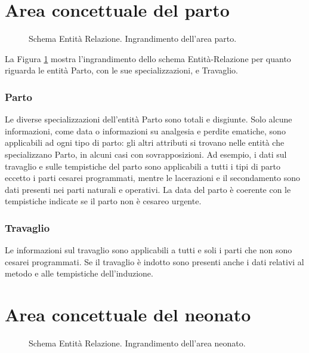 \section{Area concettuale del parto}
\label{deliveryconceptual}

\begin{figure}
    \centering
    
    \caption{Schema Entità Relazione. Ingrandimento dell'area parto.}
    \label{deliveryerdiagram}
\end{figure}

La Figura \ref{deliveryerdiagram} mostra l'ingrandimento dello schema Entità-Relazione per quanto riguarda le entità Parto, con le sue specializzazioni, e Travaglio.

\subsubsection{Parto}

Le diverse specializzazioni dell'entità Parto sono totali e disgiunte.
Solo alcune informazioni, come data o informazioni su analgesia e perdite ematiche, sono applicabili ad ogni tipo di parto: gli altri attributi si trovano nelle entità che specializzano Parto, in alcuni casi con sovrapposizioni.
Ad esempio, i dati sul travaglio e sulle tempistiche del parto sono applicabili a tutti i tipi di parto eccetto i parti cesarei programmati, mentre le lacerazioni e il secondamento sono dati presenti nei parti naturali e operativi.
La data del parto è coerente con le tempistiche indicate se il parto non è cesareo urgente.

\subsubsection{Travaglio}

Le informazioni sul travaglio sono applicabili a tutti e soli i parti che non sono cesarei programmati.
Se il travaglio è indotto sono presenti anche i dati relativi al metodo e alle tempistiche dell'induzione.

\section{Area concettuale del neonato}
\label{newbornconceptual}

\begin{figure}
    \centering
    
    \caption{Schema Entità Relazione. Ingrandimento dell'area neonato.}
    \label{newbornerdiagram}
\end{figure}

